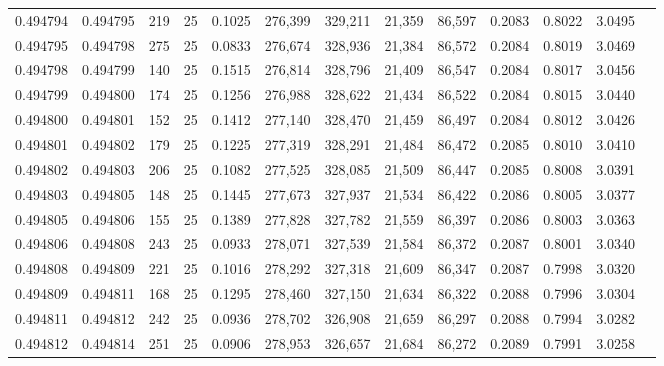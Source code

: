 \begin{tabular}{rrrrrrrrrrrrr}
0.494794 & 0.494795 &   219 &  25 &                                     0.1025 & 276,399 & 329,211 &  21,359 &  86,597 & 0.2083 & 0.8022 & 3.0495 \\
0.494795 & 0.494798 &   275 &  25 &                                     0.0833 & 276,674 & 328,936 &  21,384 &  86,572 & 0.2084 & 0.8019 & 3.0469 \\
0.494798 & 0.494799 &   140 &  25 &                                     0.1515 & 276,814 & 328,796 &  21,409 &  86,547 & 0.2084 & 0.8017 & 3.0456 \\
0.494799 & 0.494800 &   174 &  25 &                                     0.1256 & 276,988 & 328,622 &  21,434 &  86,522 & 0.2084 & 0.8015 & 3.0440 \\
0.494800 & 0.494801 &   152 &  25 &                                     0.1412 & 277,140 & 328,470 &  21,459 &  86,497 & 0.2084 & 0.8012 & 3.0426 \\
0.494801 & 0.494802 &   179 &  25 &                                     0.1225 & 277,319 & 328,291 &  21,484 &  86,472 & 0.2085 & 0.8010 & 3.0410 \\
0.494802 & 0.494803 &   206 &  25 &                                     0.1082 & 277,525 & 328,085 &  21,509 &  86,447 & 0.2085 & 0.8008 & 3.0391 \\
0.494803 & 0.494805 &   148 &  25 &                                     0.1445 & 277,673 & 327,937 &  21,534 &  86,422 & 0.2086 & 0.8005 & 3.0377 \\
0.494805 & 0.494806 &   155 &  25 &                                     0.1389 & 277,828 & 327,782 &  21,559 &  86,397 & 0.2086 & 0.8003 & 3.0363 \\
0.494806 & 0.494808 &   243 &  25 &                                     0.0933 & 278,071 & 327,539 &  21,584 &  86,372 & 0.2087 & 0.8001 & 3.0340 \\
0.494808 & 0.494809 &   221 &  25 &                                     0.1016 & 278,292 & 327,318 &  21,609 &  86,347 & 0.2087 & 0.7998 & 3.0320 \\
0.494809 & 0.494811 &   168 &  25 &                                     0.1295 & 278,460 & 327,150 &  21,634 &  86,322 & 0.2088 & 0.7996 & 3.0304 \\
0.494811 & 0.494812 &   242 &  25 &                                     0.0936 & 278,702 & 326,908 &  21,659 &  86,297 & 0.2088 & 0.7994 & 3.0282 \\
0.494812 & 0.494814 &   251 &  25 &                                     0.0906 & 278,953 & 326,657 &  21,684 &  86,272 & 0.2089 & 0.7991 & 3.0258 \\

\end{tabular}
